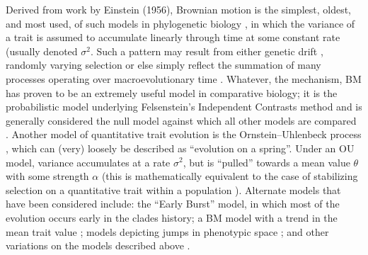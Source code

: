\documentclass[12pt]{article}
\begin{document}
Derived from work by Einstein (1956), Brownian motion is the simplest, oldest, and most used, of such models in phylogenetic biology  \citep[BM;][]{Edwards1964, Felsenstein1973, Thompson1975}, in which the variance of a trait is assumed to accumulate linearly through time at some constant rate (usually denoted $\sigma^2$. Such a pattern may result from either genetic drift \citep{Lande1976, HansenMartins1996}, randomly varying selection \citep{Felsenstein1973, Felsenstein1988} or else simply reflect the summation of many processes operating over macroevolutionary time \citep{Hansen1996, Uyeda2011, PennellHarmon, PennellPE}. Whatever, the mechanism, BM has proven to be an extremely useful model in comparative biology; it is the probabilistic model underlying Felsenstein's Independent Contrasts method \citep[][see below]{Felsenstein1985} and is generally considered the null model against which all other models are compared \citep{Blomberg2003}. %
Another model of quantitative trait evolution is the Ornstein--Uhlenbeck process \citep[OU;][]{Felsenstein1988, Hansen1997}, which can (very) loosely be described as ``evolution on a spring''. Under an OU model, variance accumulates at a rate $\sigma^2$, but is ``pulled'' towards a mean value $\theta$ with some strength $\alpha$ (this is mathematically equivalent to the case of stabilizing selection on a quantitative trait within a population \citep{Lande1976}). %
Alternate models that have been considered include: the ``Early Burst'' \citep[EB;][]{Blomberg2003, Harmon2010, SlaterPennell} model, in which most of the evolution occurs early in the clades history; a BM model with a trend in the mean trait value \citep{Hunt2006}; models depicting jumps in phenotypic space \citep{Landis2012, Eastmanlevy}; and other variations on the models described above \citep[e.g.][]{Pagel1997, Pagel1999, ButlerKing2004, Omeara2006, Eastman2011, Beaulieu2012, SlaterMEE}. 
\end{document}
